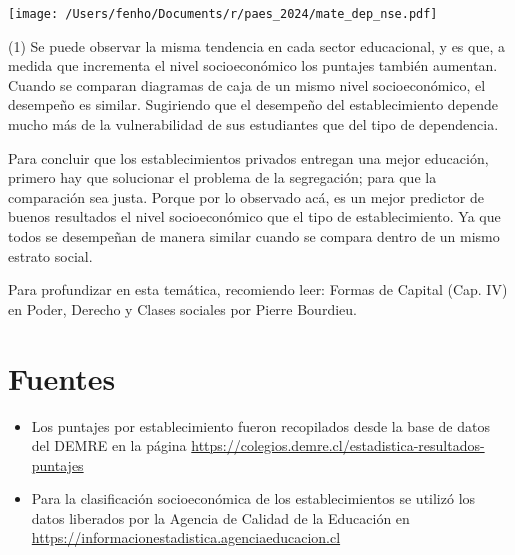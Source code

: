 \documentclass[sin nombre,con autor]{plantilla-evaluacion-v1}
\begin{document}
\texttt{[image: /Users/fenho/Documents/r/paes\_2024/mate\_dep\_nse.pdf]}

\begin{tasks}[style=itemize](1)
  \task
  Se puede observar la misma tendencia en cada sector educacional, y es que, a medida que
  incrementa el nivel socioeconómico los puntajes también aumentan.
  \task
  Cuando se comparan diagramas de caja de un mismo nivel socioeconómico, el
  desempeño es similar. Sugiriendo que el desempeño del establecimiento depende mucho más de
  la vulnerabilidad de sus estudiantes que del tipo de dependencia.
\end{tasks}


Para concluir que los establecimientos privados entregan una mejor educación, primero
hay que solucionar el problema de la segregación; para que la comparación sea justa. Porque
por lo observado acá, es un mejor predictor de buenos resultados el nivel
socioeconómico que el tipo de establecimiento. Ya que todos se desempeñan de manera
similar cuando se compara dentro de un mismo estrato social. \par

Para profundizar en esta temática, recomiendo leer: Formas de Capital (Cap. IV) en
Poder, Derecho y Clases sociales por Pierre Bourdieu. \par

\section*{Fuentes}
\begin{itemize}
  \item Los puntajes por establecimiento fueron recopilados desde la base de datos del DEMRE
  en la página \url{https://colegios.demre.cl/estadistica-resultados-puntajes}
  \item Para la clasificación socioeconómica de los establecimientos se utilizó los datos
  liberados por la Agencia de Calidad de la Educación en
  \url{https://informacionestadistica.agenciaeducacion.cl}
\end{itemize}
\end{document}
